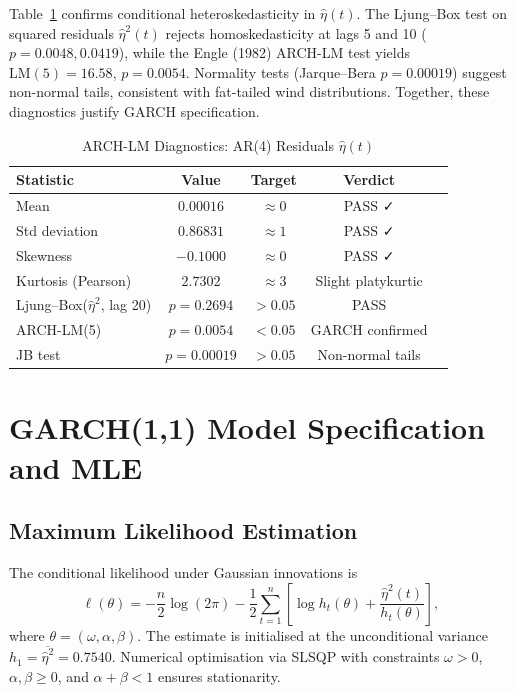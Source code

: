 \documentclass[11pt, a4paper, twoside]{article}
\begin{document}
Table~\ref{tbl:arch_lm_entry} confirms conditional heteroskedasticity in $\hat{\eta}(t)$. The Ljung--Box test on squared residuals $\hat{\eta}^2(t)$ rejects homoskedasticity at lags 5 and 10 ($p = 0.0048, 0.0419$), while the Engle (1982) ARCH-LM test yields $\text{LM}(5) = 16.58$, $p = 0.0054$. Normality tests (Jarque--Bera $p = 0.00019$) suggest non-normal tails, consistent with fat-tailed wind distributions. Together, these diagnostics justify GARCH specification.

\begin{table}[ht]
\centering
\caption{ARCH-LM Diagnostics: AR(4) Residuals $\hat{\eta}(t)$}
\label{tbl:arch_lm_entry}
\small
\begin{tabularx}{0.75\textwidth}{l|cc|cc}
\toprule
\textbf{Statistic} & \textbf{Value} & \textbf{Target} & \textbf{Verdict} \\
\midrule
Mean & $0.00016$ & $\approx 0$ & PASS ✓ \\
Std deviation & $0.86831$ & $\approx 1$ & PASS ✓ \\
Skewness & $-0.1000$ & $\approx 0$ & PASS ✓ \\
Kurtosis (Pearson) & $2.7302$ & $\approx 3$ & Slight platykurtic \\
\midrule
Ljung--Box($\hat{\eta}^2$, lag 20) & $p = 0.2694$ & $> 0.05$ & PASS \\
ARCH-LM(5) & $p = 0.0054$ & $< 0.05$ & GARCH confirmed \\
JB test & $p = 0.00019$ & $> 0.05$ & Non-normal tails \\
\bottomrule
\end{tabularx}
\end{table}

\section{GARCH(1,1) Model Specification and MLE}

\subsection{Maximum Likelihood Estimation}

The conditional likelihood under Gaussian innovations is
\begin{equation}
\ell(\theta) = -\frac{n}{2} \log(2\pi) - \frac{1}{2} \sum_{t=1}^{n} \left[ \log h_t(\theta) + \frac{\hat{\eta}^2(t)}{h_t(\theta)} \right],
\end{equation}
where $\theta = (\omega, \alpha, \beta)$. The estimate is initialised at the unconditional variance $h_1 = \overline{\hat{\eta}^2} = 0.7540$. Numerical optimisation via SLSQP with constraints $\omega > 0$, $\alpha, \beta \geq 0$, and $\alpha + \beta < 1$ ensures stationarity.
\end{document}
